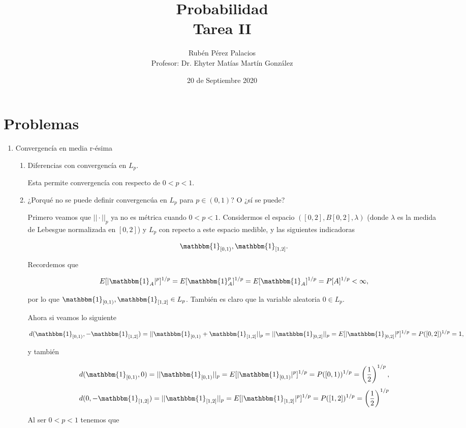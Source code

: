 \documentclass[letterpaper]{article}
\title{Probabilidad \\Tarea II}
\author{Rubén Pérez Palacios\\Profesor: Dr. Ehyter Matías Martín González}
\date{20 de Septiembre 2020}
\newcommand{\1}{\mathbbm{1}}
\begin{document}
	\maketitle
    
    \section*{Problemas}

    \begin{enumerate}
        
        \item Convergencía en media r-ésima
		
		\begin{enumerate}
			\item Diferencias con convergencía en $L_p$.
			
			Esta permite convergencía con respecto de $0<p<1$.

			\item ¿Porqué no se puede definir convergencúa en $L_p$ para $p\in(0,1)$? O ¿sí se puede?
			
			Primero veamos que $||\cdot||_p$ ya no es métrica cuando $0<p<1$. Considermos el espacio $([0,2],B[0,2],\lambda)$ (donde $\lambda$ es la medida de Lebesgue normalizada en $[0,2]$) y $L_p$ con repecto a este espacio medible, y las siguientes indicadoras 
			
			\[\mathbbm{1}_{[0,1)}, \mathbbm{1}_{[1,2]}.\]

			Recordemos que

			\[E[|\mathbbm{1}_A|^p]^{1/p} = E[\mathbbm{1}_A^p]^{1/p} = E[\mathbbm{1}_A]^{1/p} = P[A]^{1/p} < \infty,\]

			por lo que $\mathbbm{1}_{[0,1)}, \mathbbm{1}_{[1,2]} \in L_p$. También es claro que la variable aleatoria $0 \in L_p$.

			Ahora si veamos lo siguiente

			\[d(\mathbbm{1}_{[0,1)}, -\mathbbm{1}_{[1,2]}) = ||\mathbbm{1}_{[0,1)} + \mathbbm{1}_{[1,2]}||_p = ||\mathbbm{1}_{[0,2]}||_p = E[|\mathbbm{1}_{[0,2]}|^p]^{1/p} = P([0,2])^{1/p} = 1,\]

			y también

			\[d(\mathbbm{1}_{[0,1)},0) = ||\mathbbm{1}_{[0,1)}||_p = E[|\mathbbm{1}_{[0,1)}|^p]^{1/p} = P([0,1))^{1/p} = \left(\frac{1}{2}\right)^{1/p},\]
			\[d(0,-\mathbbm{1}_{[1,2]}) = ||\mathbbm{1}_{[1,2]}||_p = E[|\mathbbm{1}_{[1,2]}|^p]^{1/p} = P([1,2])^{1/p} = \left(\frac{1}{2}\right)^{1/p}\]


			Al ser $0<p<1$ tenemos que


\end{enumerate}
\end{enumerate}
\end{document}
